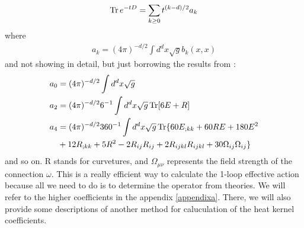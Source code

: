 \begin{align}
    \Tr e^{-tD} = \sum _{k \ge 0} t^{(k-d)/2} a_{k}
\end{align}
where
\begin{align}
    a_k = (4\pi)^{-d/2} \int d^{d}x \sqrt{g} b_{k}(x,x)
\end{align}
and not showing in detail, but just borrowing the results from \parencite{vassilevich_heat_2003}:
\begin{align}
    a_{0} &= (4\pi)^{-d/2} \int d^{d} x \sqrt{g} \\
    a_{2} &= (4\pi)^{-d/2} 6^{-1} \int d^{d} x \sqrt{g} \Tr [6E + R] \\
    a_{4} &= (4\pi)^{-d/2} 360 ^{-1} \int d^{d}x \sqrt{g} \Tr \lbrace 60E_{;kk} + 60RE + 180 E^2 \nonumber  \\
    & + 12 R_{;kk} + 5R^{2} -2R_{ij}R_{ij} + 2R_{ijkl}R_{ijkl} + 30 \Omega _{ij} \Omega _{ij}\rbrace
\end{align}
and so on. R stands for curvetures, and $\Omega _{\mu \nu}$ represents the field strength of the connection $\omega$. This is a really efficient way to calculate the 1-loop effective action because all we need to do is to determine the operator from theories. We will refer to the higher coefficients in the appendix \ref{appendixa}. There, we will also provide some descriptions of another method for caluculation of the heat kernel coefficients.

